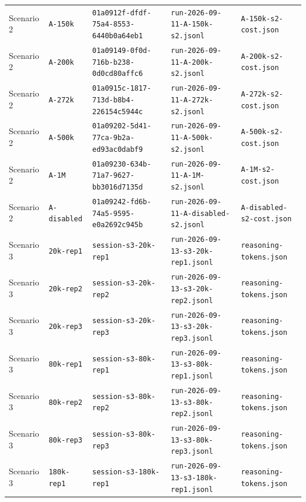\documentclass[10pt,twocolumn,a4paper]{article}
\begin{document}
\begin{table}[t]
\begin{tabular}{@{}p{18mm}p{18mm}p{54mm}p{45mm}p{30mm}@{}}
Scenario 2 & \texttt{A-150k} & {\tiny\texttt{01a0912f-dfdf-75a4-8553-6440b0a64eb1}} & {\tiny\texttt{run-2026-09-11-A-150k-s2.jsonl}} & {\tiny\texttt{A-150k-s2-cost.json}} \\
Scenario 2 & \texttt{A-200k} & {\tiny\texttt{01a09149-0f0d-716b-b238-0d0cd80affc6}} & {\tiny\texttt{run-2026-09-11-A-200k-s2.jsonl}} & {\tiny\texttt{A-200k-s2-cost.json}} \\
Scenario 2 & \texttt{A-272k} & {\tiny\texttt{01a0915c-1817-713d-b8b4-226154c5944c}} & {\tiny\texttt{run-2026-09-11-A-272k-s2.jsonl}} & {\tiny\texttt{A-272k-s2-cost.json}} \\
Scenario 2 & \texttt{A-500k} & {\tiny\texttt{01a09202-5d41-77ca-9b2a-ed93ac0dabf9}} & {\tiny\texttt{run-2026-09-11-A-500k-s2.jsonl}} & {\tiny\texttt{A-500k-s2-cost.json}} \\
Scenario 2 & \texttt{A-1M} & {\tiny\texttt{01a09230-634b-71a7-9627-bb3016d7135d}} & {\tiny\texttt{run-2026-09-11-A-1M-s2.jsonl}} & {\tiny\texttt{A-1M-s2-cost.json}} \\
Scenario 2 & \texttt{A-disabled} & {\tiny\texttt{01a09242-fd6b-74a5-9595-e0a2692c945b}} & {\tiny\texttt{run-2026-09-11-A-disabled-s2.jsonl}} & {\tiny\texttt{A-disabled-s2-cost.json}} \\
\midrule
Scenario 3 & \texttt{20k-rep1} & {\tiny\texttt{session-s3-20k-rep1}} & {\tiny\texttt{run-2026-09-13-s3-20k-rep1.jsonl}} & {\tiny\texttt{reasoning-tokens.json}} \\
Scenario 3 & \texttt{20k-rep2} & {\tiny\texttt{session-s3-20k-rep2}} & {\tiny\texttt{run-2026-09-13-s3-20k-rep2.jsonl}} & {\tiny\texttt{reasoning-tokens.json}} \\
Scenario 3 & \texttt{20k-rep3} & {\tiny\texttt{session-s3-20k-rep3}} & {\tiny\texttt{run-2026-09-13-s3-20k-rep3.jsonl}} & {\tiny\texttt{reasoning-tokens.json}} \\
Scenario 3 & \texttt{80k-rep1} & {\tiny\texttt{session-s3-80k-rep1}} & {\tiny\texttt{run-2026-09-13-s3-80k-rep1.jsonl}} & {\tiny\texttt{reasoning-tokens.json}} \\
Scenario 3 & \texttt{80k-rep2} & {\tiny\texttt{session-s3-80k-rep2}} & {\tiny\texttt{run-2026-09-13-s3-80k-rep2.jsonl}} & {\tiny\texttt{reasoning-tokens.json}} \\
Scenario 3 & \texttt{80k-rep3} & {\tiny\texttt{session-s3-80k-rep3}} & {\tiny\texttt{run-2026-09-13-s3-80k-rep3.jsonl}} & {\tiny\texttt{reasoning-tokens.json}} \\
Scenario 3 & \texttt{180k-rep1} & {\tiny\texttt{session-s3-180k-rep1}} & {\tiny\texttt{run-2026-09-13-s3-180k-rep1.jsonl}} & {\tiny\texttt{reasoning-tokens.json}} \\

\end{tabular}
\end{table}
\end{document}
